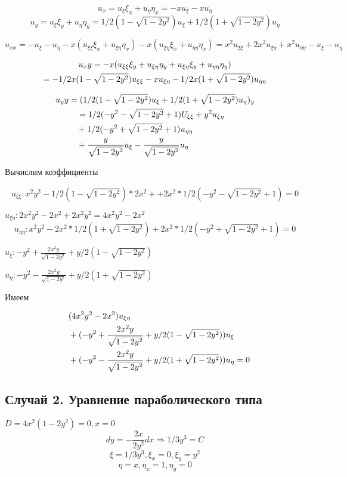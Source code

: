 \documentclass[12pt]{article}
\begin{document}
$$u_x = u_{\xi}\xi_x + u_{\eta}\eta_x = -xu_{\xi} - xu_{\eta}$$
$$u_y = u_{\xi}\xi_y + u_{\eta}\eta_y = 1/2(1 - \sqrt{1-2y^2})u_{\xi} + 1/2(1 + \sqrt{1-2y^2})u_{\eta}$$

$$u_{xx} = -u_\xi - u_\eta - x(u_{\xi\xi}\xi_x + u_{\xi\eta}\eta_x)
- x(u_{\xi\eta}\xi_x + u_{\eta\eta}\eta_x) = 
x^2u_{\xi\xi} + 2x^2u_{\xi\eta} + x^2u_{\eta\eta} - u_\xi - u_\eta$$

\begin{multline}
u_xy = -x(u_{\xi\xi}\xi_y + u_{\xi\eta}\eta_y + u_{\xi\eta}\xi_y + u_{\eta\eta}\eta_y) \notag \\
= -1/2x(1 - \sqrt{1-2y^2})u_{\xi\xi} - xu_{\xi\eta} - 1/2x(1 + \sqrt{1-2y^2})u_{\eta\eta}
\end{multline}

\begin{align}
    u_yy &= (1/2(1 - \sqrt{1-2y^2})u_\xi + 1/2(1 + \sqrt{1-2y^2})u_\eta)_y \notag \\
    &\quad = 1/2(-y^2 - \sqrt{1-2y^2} + 1)U_{\xi\xi} + y^2u_{\xi\eta} \notag \\ 
    & \quad + 1/2(-y^2 + \sqrt{1-2y^2} + 1)u_{\eta\eta} \notag \\
    &\quad + \frac{y}{\sqrt{1-2y^2}}u_\xi - \frac{y}{\sqrt{1-2y^2}}u_\eta \notag
\end{align}

Вычислим коэффициенты

$$u_{\xi\xi} : x^2y^2 - 1/2(1 - \sqrt{1-2y^2})*2x^2 + 
+ 2x^2*1/2(-y^2 - \sqrt{1-2y^2} + 1) = 0$$

$u_{\xi\eta} : 2x^2y^2 - 2x^2 + 2x^2y^2 = 4x^2y^2 - 2x^2$
$$u_{\eta\eta} : x^2y^2 - 2x^2*1/2(1+\sqrt{1-2y^2}) + 2x^2*1/2(-y^2 + \sqrt{1-2y^2} + 1) = 0$$

$u_\xi : -y^2 + \frac{2x^2y}{\sqrt{1-2y^2}} + y/2(1-\sqrt{1-2y^2})$

$u_\eta : -y^2 - \frac{2x^2y}{\sqrt{1-2y^2}} + y/2(1+\sqrt{1-2y^2})$

Имеем

\begin{align}
    &\quad(4x^2y^2 - 2x^2)u_{\xi\eta} \notag \\
    &\quad+ (-y^2 + \frac{2x^2y}{\sqrt{1-2y^2}} + y/2(1-\sqrt{1-2y^2}))u_\xi \notag \\
    &\quad+ (-y^2 - \frac{2x^2y}{\sqrt{1-2y^2}} + y/2(1+\sqrt{1-2y^2}))u_\eta = 0
\end{align}

\subsection{Случай 2. Уравнение параболического типа}
$D = 4x^2(1-2y^2) = 0, x = 0$
$$dy = -\frac{2x}{2y^2}dx \Rightarrow 1/3y^3 = C$$
$$\xi = 1/3y^3, \xi_x = 0, \xi_y = y^2$$
$$\eta = x, \eta_x = 1, \eta_y = 0$$
\end{document}
